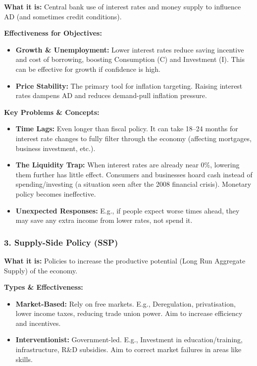 \documentclass[11pt, a4paper, twoside]{book}
\begin{document}
\textbf{What it is:} Central bank use of interest rates and money supply to influence AD (and sometimes credit conditions).

\textbf{Effectiveness for Objectives:}
\begin{itemize}
  \item \textbf{Growth \& Unemployment:} Lower interest rates reduce saving incentive and cost of borrowing, boosting Consumption (C) and Investment (I). This can be effective for growth if confidence is high.
  \item \textbf{Price Stability:} The primary tool for inflation targeting. Raising interest rates dampens AD and reduces demand-pull inflation pressure.
\end{itemize}

\textbf{Key Problems \& Concepts:}
\begin{itemize}
  \item \textbf{Time Lags:} Even longer than fiscal policy. It can take 18--24 months for interest rate changes to fully filter through the economy (affecting mortgages, business investment, etc.).
  \item \textbf{The Liquidity Trap:} When interest rates are already near 0\%, lowering them further has little effect. Consumers and businesses hoard cash instead of spending/investing (a situation seen after the 2008 financial crisis). Monetary policy becomes ineffective.
  \item \textbf{Unexpected Responses:} E.g., if people expect worse times ahead, they may save any extra income from lower rates, not spend it.
\end{itemize}

\subsubsection{3. Supply-Side Policy (SSP)}

\textbf{What it is:} Policies to increase the productive potential (Long Run Aggregate Supply) of the economy.

\textbf{Types \& Effectiveness:}
\begin{itemize}
  \item \textbf{Market-Based:} Rely on free markets. E.g., Deregulation, privatisation, lower income taxes, reducing trade union power. Aim to increase efficiency and incentives.
  \item \textbf{Interventionist:} Government-led. E.g., Investment in education/training, infrastructure, R\&D subsidies. Aim to correct market failures in areas like skills.
\end{itemize}
\end{document}
